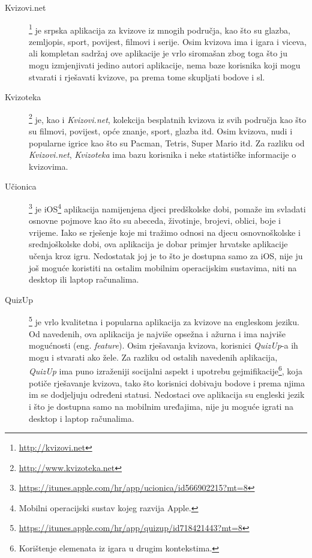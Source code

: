 \documentclass{scrreprt}
\begin{document}
\begin{description}

  \item[Kvizovi.net]\footnote{\url{http://kvizovi.net}} je srpska aplikacija za
    kvizove iz mnogih područja, kao što su glazba, zemljopis, sport, povijest,
    filmovi i serije. Osim kvizova ima i igara i viceva, ali kompletan sadržaj
    ove aplikacije je vrlo siromašan zbog toga što ju mogu izmjenjivati jedino
    autori aplikacije, nema baze korisnika koji mogu stvarati i rješavati
    kvizove, pa prema tome skupljati bodove i sl.

  \item[Kvizoteka]\footnote{\url{http://www.kvizoteka.net}} je, kao i
    \emph{Kvizovi.net}, kolekcija besplatnih kvizova iz svih područja kao što su
    filmovi, povijest, opće znanje, sport, glazba itd. Osim kvizova, nudi i
    popularne igrice kao što su Pacman, Tetris, Super Mario itd. Za razliku od
    \emph{Kvizovi.net}, \emph{Kvizoteka} ima bazu korisnika i neke statističke
    informacije o kvizovima.

  \item[Učionica]\footnote{\url{https://itunes.apple.com/hr/app/ucionica/id566902215?mt=8}}
    je iOS\footnote{Mobilni operacijski sustav kojeg razvija Apple.} aplikacija
    namijenjena djeci predškolske dobi, pomaže im svladati osnovne pojmove kao
    što su abeceda, životinje, brojevi, oblici, boje i vrijeme. Iako se
    rješenje koje mi tražimo odnosi na djecu osnovnoškolske i srednjoškolske
    dobi, ova aplikacija je dobar primjer hrvatske aplikacije učenja kroz igru.
    Nedostatak joj je to što je dostupna samo za iOS, nije ju još moguće
    koristiti na ostalim mobilnim operacijskim sustavima, niti na desktop ili
    laptop računalima.

  \item[QuizUp]\footnote{\url{https://itunes.apple.com/hr/app/quizup/id718421443?mt=8}}
    je vrlo kvalitetna i popularna aplikacija za kvizove na engleskom jeziku.
    Od navedenih, ova aplikacija je najviše opsežna i ažurna i ima najviše
    mogućnosti (eng. \emph{feature}). Osim rješavanja kvizova, korisnici
    \emph{QuizUp}-a ih mogu i stvarati ako žele. Za razliku od ostalih
    navedenih aplikacija, \emph{QuizUp} ima puno izraženiji socijalni aspekt i
    upotrebu gejmifikacije\footnote{Korištenje elemenata iz igara u drugim
    kontekstima.}, koja potiče rješavanje kvizova, tako što korisnici dobivaju
    bodove i prema njima im se dodjeljuju određeni statusi. Nedostaci ove
    aplikacija su engleski jezik i što je dostupna samo na mobilnim uređajima,
    nije ju moguće igrati na desktop i laptop računalima.

\end{description}
\end{document}

